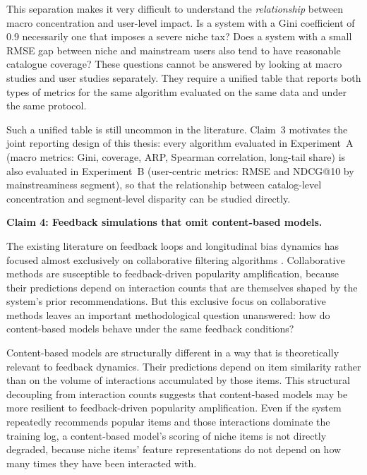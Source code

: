 \documentclass[11pt,a4paper]{report}
\begin{document}
This separation makes it very difficult to understand the \emph{relationship} between macro concentration and user-level impact. Is a system with a Gini coefficient of 0.9 necessarily one that imposes a severe niche tax? Does a system with a small RMSE gap between niche and mainstream users also tend to have reasonable catalogue coverage? These questions cannot be answered by looking at macro studies and user studies separately. They require a unified table that reports both types of metrics for the same algorithm evaluated on the same data and under the same protocol.

Such a unified table is still uncommon in the literature. Claim~3 motivates the joint reporting design of this thesis: every algorithm evaluated in Experiment~A (macro metrics: Gini, coverage, ARP, Spearman correlation, long-tail share) is also evaluated in Experiment~B (user-centric metrics: RMSE and NDCG@10 by mainstreaminess segment), so that the relationship between catalog-level concentration and segment-level disparity can be studied directly.

\vspace{0.75em}
\noindent\textbf{Claim 4: Feedback simulations that omit content-based models.}

The existing literature on feedback loops and longitudinal bias dynamics has focused almost exclusively on collaborative filtering algorithms \citep{chaney2018algorithmic, mansoury2020feedback, jiang2019degenerate}.
 Collaborative methods are susceptible to feedback-driven popularity amplification, because their predictions depend on interaction counts that are themselves shaped by the system's prior recommendations. But this exclusive focus on collaborative methods leaves an important methodological question unanswered: how do content-based models behave under the same feedback conditions?

Content-based models are structurally different in a way that is theoretically relevant to feedback dynamics. 
Their predictions depend on item similarity rather than on the volume of interactions accumulated by those items. This structural decoupling from interaction counts suggests that content-based models may be more resilient to feedback-driven popularity amplification. Even if the system repeatedly recommends popular items and those interactions dominate the training log, a content-based model's scoring of niche items is not directly degraded, because niche items' feature representations do not depend on how many times they have been interacted with.
\end{document}
